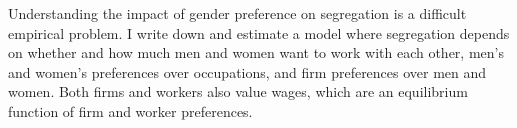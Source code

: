 \documentclass[11pt]{article}
\begin{document}





Understanding the impact of gender preference on segregation is a difficult empirical problem. I write down and estimate a model where segregation depends on whether and how much men and women want to work with each other, men's and women's preferences over occupations, and firm preferences over men and women. Both firms and workers also value wages, which are an equilibrium function of firm and worker preferences. 
\end{document}
